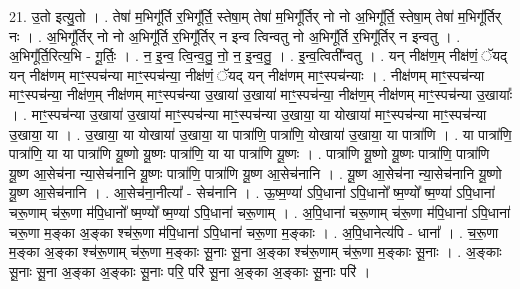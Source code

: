 \documentclass[17pt]{extarticle}
\begin{document}
21. उ॒तो इत्यु॒तो । . तेषा॑ म॒भिगू᳚र्ति र॒भिगू᳚र्ति॒ स्तेषा॒म् तेषा॑ म॒भिगू᳚र्तिर् नो नो अ॒भिगू᳚र्ति॒ स्तेषा॒म् तेषा॑ म॒भिगू᳚र्तिर् नः । . अ॒भिगू᳚र्तिर् नो नो अ॒भिगू᳚र्ति र॒भिगू᳚र्तिर् न इन्व त्विन्वतु नो अ॒भिगू᳚र्ति र॒भिगू᳚र्तिर् न इन्वतु । . अ॒भिगू᳚र्ति॒रित्य॒भि - गू॒र्तिः॒ । . न॒ इ॒न्व॒ त्वि॒न्व॒तु॒ नो॒ न॒ इ॒न्व॒तु॒ । . इ॒न्व॒त्विती᳚न्वतु । . यन् नीक्ष॑ण॒म् नीक्ष॑णं॒ ॅयद् यन् नीक्ष॑णम् माꣳ॒॒स्पच॑न्या माꣳ॒॒स्पच॑न्या॒ नीक्ष॑णं॒ ॅयद् यन् नीक्ष॑णम् माꣳ॒॒स्पच॑न्याः । . नीक्ष॑णम् माꣳ॒॒स्पच॑न्या माꣳ॒॒स्पच॑न्या॒ नीक्ष॑ण॒म् नीक्ष॑णम् माꣳ॒॒स्पच॑न्या उ॒खाया॑ उ॒खाया॑ माꣳ॒॒स्पच॑न्या॒ नीक्ष॑ण॒म् नीक्ष॑णम् माꣳ॒॒स्पच॑न्या उ॒खायाः᳚ । . माꣳ॒॒स्पच॑न्या उ॒खाया॑ उ॒खाया॑ माꣳ॒॒स्पच॑न्या माꣳ॒॒स्पच॑न्या उ॒खाया॒ या योखाया॑ माꣳ॒॒स्पच॑न्या माꣳ॒॒स्पच॑न्या उ॒खाया॒ या । . उ॒खाया॒ या योखाया॑ उ॒खाया॒ या पात्रा॑णि॒ पात्रा॑णि॒ योखाया॑ उ॒खाया॒ या पात्रा॑णि । . या पात्रा॑णि॒ पात्रा॑णि॒ या या पात्रा॑णि यू॒ष्णो यू॒ष्णः पात्रा॑णि॒ या या पात्रा॑णि यू॒ष्णः । . पात्रा॑णि यू॒ष्णो यू॒ष्णः पात्रा॑णि॒ पात्रा॑णि यू॒ष्ण आ॒सेच॑ना न्या॒सेच॑नानि यू॒ष्णः पात्रा॑णि॒ पात्रा॑णि यू॒ष्ण आ॒सेच॑नानि । . यू॒ष्ण आ॒सेच॑ना न्या॒सेच॑नानि यू॒ष्णो यू॒ष्ण आ॒सेच॑नानि । . आ॒सेच॑ना॒नीत्या᳚ - सेच॑नानि । . ऊ॒ष्म॒ण्या॑ ऽपि॒धाना॑ ऽपि॒धानो᳚ ष्म॒ण्यो᳚ ष्म॒ण्या॑ ऽपि॒धाना॑ चरू॒णाम् च॑रू॒णा म॑पि॒धानो᳚ ष्म॒ण्यो᳚ ष्म॒ण्या॑ ऽपि॒धाना॑ चरू॒णाम् । . अ॒पि॒धाना॑ चरू॒णाम् च॑रू॒णा म॑पि॒धाना॑ ऽपि॒धाना॑ चरू॒णा म॒ङ्का अ॒ङ्का श्च॑रू॒णा म॑पि॒धाना॑ ऽपि॒धाना॑ चरू॒णा म॒ङ्काः । . अ॒पि॒धानेत्य॑पि - धाना᳚ । . च॒रू॒णा म॒ङ्का अ॒ङ्का श्च॑रू॒णाम् च॑रू॒णा म॒ङ्काः सू॒नाः सू॒ना अ॒ङ्का श्च॑रू॒णाम् च॑रू॒णा म॒ङ्काः सू॒नाः । . अ॒ङ्काः सू॒नाः सू॒ना अ॒ङ्का अ॒ङ्काः सू॒नाः परि॒ परि॑ सू॒ना अ॒ङ्का अ॒ङ्काः सू॒नाः परि॑ । \newline
\end{document}

